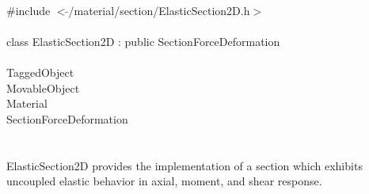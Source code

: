 
   \\
\indent \#include $<\tilde{ }$/material/section/ElasticSection2D.h$>$  \\

  \\
\indent class ElasticSection2D : public SectionForceDeformation \\

 \\
\indent TaggedObject \\
\indent MovableObject \\
\indent\indent Material \\
\indent\indent\indent SectionForceDeformation \\
\indent\indent\indent{} \\

  \\
\indent ElasticSection2D provides the implementation of a
section which exhibits uncoupled elastic behavior in axial, moment,
and shear response. \\

